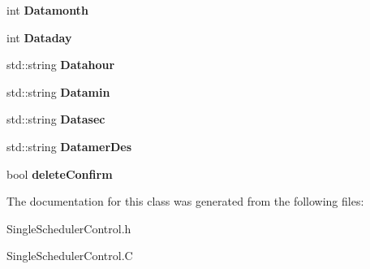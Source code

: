 \begin{DoxyCompactItemize}
\item 
int {\bfseries Datamonth}\hypertarget{classSingleSchedulerControlWidget_acf568679a63621149ab2212944241684}{}\label{classSingleSchedulerControlWidget_acf568679a63621149ab2212944241684}

\item 
int {\bfseries Dataday}\hypertarget{classSingleSchedulerControlWidget_a8d3a1c66c75980878c35700a6544ae94}{}\label{classSingleSchedulerControlWidget_a8d3a1c66c75980878c35700a6544ae94}

\item 
std\+::string {\bfseries Datahour}\hypertarget{classSingleSchedulerControlWidget_a7141fd690ac8ad3db9f4539763ad3db9}{}\label{classSingleSchedulerControlWidget_a7141fd690ac8ad3db9f4539763ad3db9}

\item 
std\+::string {\bfseries Datamin}\hypertarget{classSingleSchedulerControlWidget_abb4a09ba0ce3ad37119bd0a13eb1979a}{}\label{classSingleSchedulerControlWidget_abb4a09ba0ce3ad37119bd0a13eb1979a}

\item 
std\+::string {\bfseries Datasec}\hypertarget{classSingleSchedulerControlWidget_a5b662da906b80bb884245b96fc23dd68}{}\label{classSingleSchedulerControlWidget_a5b662da906b80bb884245b96fc23dd68}

\item 
std\+::string {\bfseries Datamer\+Des}\hypertarget{classSingleSchedulerControlWidget_a13ced62f55d57453da0a2f673e52d5d5}{}\label{classSingleSchedulerControlWidget_a13ced62f55d57453da0a2f673e52d5d5}

\item 
bool {\bfseries delete\+Confirm}\hypertarget{classSingleSchedulerControlWidget_a194a0b611fadec029f0e7c55154ed903}{}\label{classSingleSchedulerControlWidget_a194a0b611fadec029f0e7c55154ed903}

\end{DoxyCompactItemize}


The documentation for this class was generated from the following files\+:\begin{DoxyCompactItemize}
\item 
Single\+Scheduler\+Control.\+h\item 
Single\+Scheduler\+Control.\+C\end{DoxyCompactItemize}
